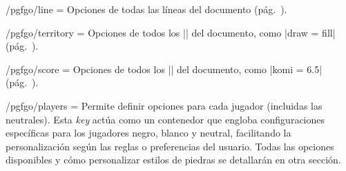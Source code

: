 \begin{key}{/pgfgo/line = }
	Opciones de todas las líneas del documento (pág.~\pageref{subsec:flechas}).
\end{key}

\begin{key}{/pgfgo/territory = }
	Opciones de todos los |\territory| del documento, como |draw = fill| (pág.~\pageref{subsec:territorio}).
\end{key}

\begin{key}{/pgfgo/score = }
	Opciones de todos los |\pgfgoscore| del documento, como |komi = 6.5| (pág.~\pageref{subsec:territorio}).
\end{key}

\begin{key}{/pgfgo/players = }
	Permite definir opciones para cada jugador (incluidas las neutrales). Esta \emph{key} actúa como un contenedor que engloba configuraciones específicas para los jugadores negro, blanco y neutral, facilitando la personalización según las reglas o preferencias del usuario. Todas las opciones disponibles y cómo personalizar estilos de piedras se detallarán en otra sección.
\end{key}

\begin{codeexample}[]
	
	\begin{goban}[3]
	\end{goban}
	
	\begin{goban}[4]
	\end{goban}
\end{codeexample}

